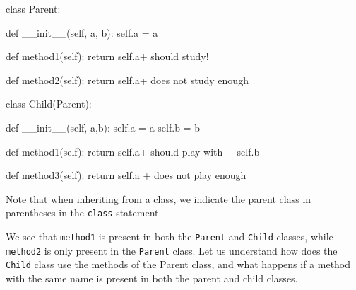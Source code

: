 \documentclass[
  letterpaper,
  DIV=11,
  numbers=noendperiod]{scrreprt}
\newenvironment{Shaded}{\begin{snugshade}}{\end{snugshade}}
\newcommand{\ControlFlowTok}[1]{\textcolor[rgb]{0.00,0.23,0.31}{#1}}
\newcommand{\FunctionTok}[1]{\textcolor[rgb]{0.28,0.35,0.67}{#1}}
\newcommand{\KeywordTok}[1]{\textcolor[rgb]{0.00,0.23,0.31}{#1}}
\newcommand{\NormalTok}[1]{\textcolor[rgb]{0.00,0.23,0.31}{#1}}
\newcommand{\OperatorTok}[1]{\textcolor[rgb]{0.37,0.37,0.37}{#1}}
\newcommand{\StringTok}[1]{\textcolor[rgb]{0.13,0.47,0.30}{#1}}
\newcommand{\VariableTok}[1]{\textcolor[rgb]{0.07,0.07,0.07}{#1}}
\begin{document}
\begin{Shaded}
\begin{Highlighting}[]
\KeywordTok{class}\NormalTok{ Parent:}
    
    \KeywordTok{def} \FunctionTok{\_\_init\_\_}\NormalTok{(}\VariableTok{self}\NormalTok{, a, b):}
        \VariableTok{self}\NormalTok{.a }\OperatorTok{=}\NormalTok{ a}
        
    \KeywordTok{def}\NormalTok{ method1(}\VariableTok{self}\NormalTok{):}
        \ControlFlowTok{return} \VariableTok{self}\NormalTok{.a}\OperatorTok{+}\StringTok{\textquotesingle{} should study!\textquotesingle{}}
    
    \KeywordTok{def}\NormalTok{ method2(}\VariableTok{self}\NormalTok{):}
        \ControlFlowTok{return} \VariableTok{self}\NormalTok{.a}\OperatorTok{+}\StringTok{\textquotesingle{} does not study enough \textquotesingle{}}

\KeywordTok{class}\NormalTok{ Child(Parent):}
    
    \KeywordTok{def} \FunctionTok{\_\_init\_\_}\NormalTok{(}\VariableTok{self}\NormalTok{, a,b):}
        \VariableTok{self}\NormalTok{.a }\OperatorTok{=}\NormalTok{ a}
        \VariableTok{self}\NormalTok{.b }\OperatorTok{=}\NormalTok{ b}
        
    \KeywordTok{def}\NormalTok{ method1(}\VariableTok{self}\NormalTok{):}
        \ControlFlowTok{return} \VariableTok{self}\NormalTok{.a}\OperatorTok{+}\StringTok{\textquotesingle{} should play with \textquotesingle{}} \OperatorTok{+} \VariableTok{self}\NormalTok{.b}
    
    \KeywordTok{def}\NormalTok{ method3(}\VariableTok{self}\NormalTok{):}
        \ControlFlowTok{return} \VariableTok{self}\NormalTok{.a }\OperatorTok{+} \StringTok{\textquotesingle{} does not play enough\textquotesingle{}}
\end{Highlighting}
\end{Shaded}

Note that when inheriting from a class, we indicate the parent class in
parentheses in the \texttt{class} statement.

We see that \texttt{method1} is present in both the \texttt{Parent} and
\texttt{Child} classes, while \texttt{method2} is only present in the
\texttt{Parent} class. Let us understand how does the \texttt{Child}
class use the methods of the Parent class, and what happens if a method
with the same name is present in both the parent and child classes.
\end{document}
